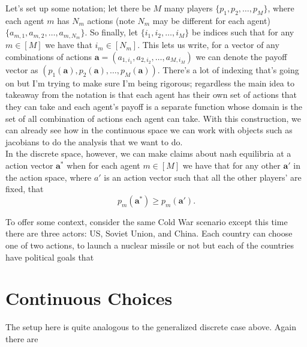 \documentclass[11pt,english]{article}
\begin{document}
\noindent Let's set up some notation; let there be $M$ many players $\{p_1, p_2, \ldots, p_M\}$, where each agent $m$ has $N_m$ actions (note $N_m$ may be different for each agent) $\{a_{m,1}, a_{m,2}, \ldots, a_{m,N_m}\}$. So finally, let $\{i_1, i_2, \ldots, i_M\}$ be indices such that for any $m\in [M]$ we have that $i_m\in [N_m]$. This lets us write, for a vector of any combinations of actions $\mathbf{a} = (a_{1,i_1}, a_{2, i_2}, \ldots, a_{M, i_M})$ we can denote the payoff vector as $(p_1(\mathbf{a}), p_2(\mathbf{a}), \ldots, p_M(\mathbf{a}))$. There's a lot of indexing that's going on but I'm trying to make sure I'm being rigorous; regardless the main idea to takeaway from the notation is that each agent has their own set of actions that they can take and each agent's payoff is a separate function whose domain is the set of all combination of actions each agent can take. With this construction, we can already see how in the continuous space we can work with objects such as jacobians to do the analysis that we want to do.\\

\noindent In the discrete space, however, we can make claims about nash equilibria at a action vector $\mathbf{a^*}$ when for each agent $m\in [M]$ we have that for any other $\mathbf{a'}$ in the action space, where $a'$ is an action vector such that all the other players' are fixed, that $$p_m(\mathbf{a^*}) \geq p_m(\mathbf{a'}).$$

\noindent To offer some context, consider the same Cold War scenario except this time there are three actors: US, Soviet Union, and China. Each country can choose one of two actions, to launch a nuclear missile or not but each of the countries have political goals that 

\section*{Continuous Choices}

The setup here is quite analogous to the generalized discrete case above. Again there are 
\end{document}
